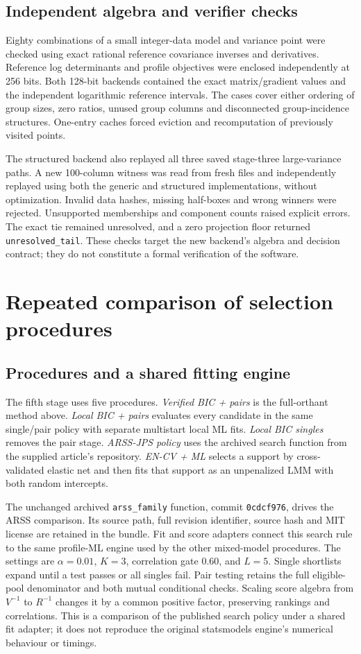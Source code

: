 \documentclass[11pt,a4paper]{article}
\theoremstyle{remark}\newtheorem{remark}[theorem]{Remark}
\begin{document}
\subsection{Independent algebra and verifier checks}
Eighty combinations of a small integer-data model and variance point were
checked using exact rational reference covariance inverses and derivatives.
Reference log determinants and profile objectives were enclosed independently
at 256 bits. Both 128-bit backends contained the exact matrix/gradient values
and the independent logarithmic reference intervals. The cases cover either
ordering of group sizes, zero ratios, unused group columns and disconnected
group-incidence structures. One-entry caches forced eviction and recomputation
of previously visited points.

The structured backend also replayed all three saved stage-three large-variance
paths. A new 100-column witness was read from fresh files and independently
replayed using both the generic and structured implementations, without
optimization. Invalid data hashes, missing half-boxes and wrong winners were
rejected. Unsupported memberships and component counts raised explicit errors.
The exact tie remained unresolved, and a zero projection floor returned
\texttt{unresolved\_tail}. These checks target the new backend's algebra and
decision contract; they do not constitute a formal verification of the software.

\section{Repeated comparison of selection procedures}
\subsection{Procedures and a shared fitting engine}
The fifth stage uses five procedures. \emph{Verified BIC + pairs} is the
full-orthant method above. \emph{Local BIC + pairs} evaluates every candidate
in the same single/pair policy with separate multistart local ML fits.
\emph{Local BIC singles} removes the pair stage. \emph{ARSS-JPS policy}
uses the archived search function from the supplied article's repository.
\emph{EN-CV + ML} selects a support by cross-validated elastic net and then
fits that support as an unpenalized LMM with both random intercepts.

The unchanged archived \texttt{arss\_family} function, commit
\texttt{0cdcf976}, drives the ARSS comparison. Its source path, full revision
identifier, source hash and MIT license are retained in the bundle.
Fit and score adapters connect this search rule to
the same profile-ML engine used by the other mixed-model procedures.
The settings are $\alpha=0.01$, $K=3$, correlation gate $0.60$, and $L=5$.
Single shortlists expand until a test passes or all singles fail. Pair testing
retains the full eligible-pool denominator and both mutual conditional checks.
Scaling score algebra from $V^{-1}$ to $R^{-1}$ changes it by a common positive
factor, preserving rankings and correlations. This is a comparison of the
published search policy under a shared fit adapter; it does not reproduce the
original statsmodels engine's numerical behaviour or timings.
\end{document}
